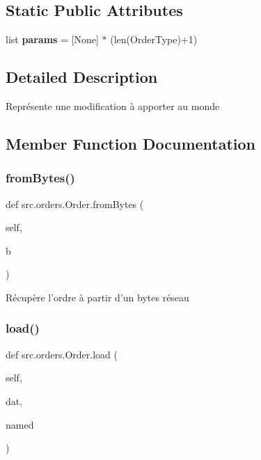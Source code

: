 \subsection*{Static Public Attributes}
\begin{DoxyCompactItemize}
\item 
\hypertarget{classsrc_1_1orders_1_1_order_aea1b5b56bf067b0d46f7a799b7b32abf}{}\label{classsrc_1_1orders_1_1_order_aea1b5b56bf067b0d46f7a799b7b32abf} 
list {\bfseries params} = \mbox{[}None\mbox{]} $\ast$ (len(Order\+Type)+1)
\end{DoxyCompactItemize}


\subsection{Detailed Description}
\begin{DoxyVerb}Représente une modification à apporter au monde \end{DoxyVerb}
 

\subsection{Member Function Documentation}
\hypertarget{classsrc_1_1orders_1_1_order_a18fc5c9c0f07bb4c96168e99457a1445}{}\label{classsrc_1_1orders_1_1_order_a18fc5c9c0f07bb4c96168e99457a1445} 
\subsubsection{\texorpdfstring{from\+Bytes()}{fromBytes()}}
{\footnotesize\ttfamily def src.\+orders.\+Order.\+from\+Bytes (\begin{DoxyParamCaption}\item[{}]{self,  }\item[{}]{b }\end{DoxyParamCaption})}

\begin{DoxyVerb}Récupère l'ordre à partir d'un bytes réseau \end{DoxyVerb}
 \hypertarget{classsrc_1_1orders_1_1_order_a1438c0601f3b3f0d9d0c2f10a92ef005}{}\label{classsrc_1_1orders_1_1_order_a1438c0601f3b3f0d9d0c2f10a92ef005} 
\subsubsection{\texorpdfstring{load()}{load()}}
{\footnotesize\ttfamily def src.\+orders.\+Order.\+load (\begin{DoxyParamCaption}\item[{}]{self,  }\item[{}]{dat,  }\item[{}]{named }\end{DoxyParamCaption})}

